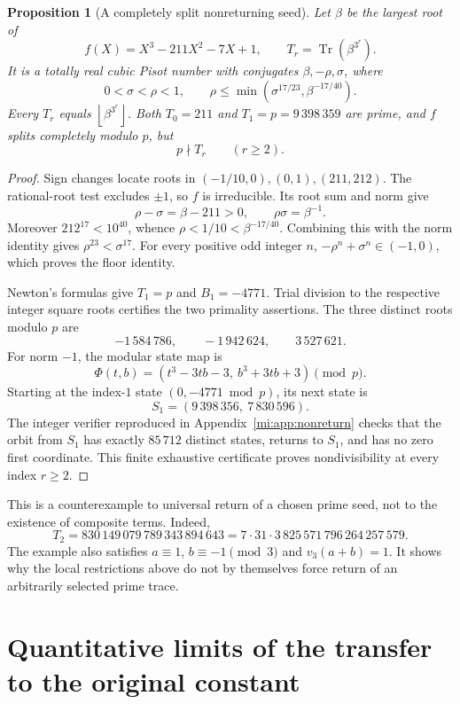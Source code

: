 \documentclass[11pt,a4paper]{article}
\numberwithin{equation}{section}
\newtheorem{proposition}[theorem]{Proposition}
\theoremstyle{definition}
\theoremstyle{remark}
\newcommand{\Tr}{\operatorname{Tr}}
\newcommand{\floor}[1]{\left\lfloor #1\right\rfloor}
\begin{document}
\begin{proposition}[A completely split nonreturning seed]
\label{mi:seed}
Let \(\beta\) be the largest root of
\[
 f(X)=X^3-211X^2-7X+1,
 \qquad T_r=\Tr(\beta^{3^r}).
\]
It is a totally real cubic Pisot number with conjugates
\(\beta,-\rho,\sigma\), where
\[
 0<\sigma<\rho<1,\qquad
 \rho\le\min(\sigma^{17/23},\beta^{-17/40}).
\]
Every \(T_r\) equals \(\floor{\beta^{3^r}}\).
Both \(T_0=211\) and \(T_1=p=9\,398\,359\) are prime, and \(f\)
splits completely modulo \(p\), but
\[
 p\nmid T_r\qquad(r\ge2).
\]
\end{proposition}

\begin{proof}
Sign changes locate roots in \((-1/10,0),(0,1),(211,212)\).
The rational-root test excludes \(\pm1\), so \(f\) is irreducible.
Its root sum and norm give
\[
 \rho-\sigma=\beta-211>0,\qquad \rho\sigma=\beta^{-1}.
\]
Moreover \(212^{17}<10^{40}\), whence
\(\rho<1/10<\beta^{-17/40}\).
Combining this with the norm identity gives
\(\rho^{23}<\sigma^{17}\).
For every positive odd integer \(n\),
\(-\rho^n+\sigma^n\in(-1,0)\), which proves the floor identity.

Newton's formulas give \(T_1=p\) and \(B_1=-4771\).
Trial division to the respective integer square roots certifies
the two primality assertions. The three distinct roots modulo
\(p\) are
\[
 -1\,584\,786,\qquad -1\,942\,624,\qquad 3\,527\,621.
\]
For norm \(-1\), the modular state map is
\[
 \Phi(t,b)=(t^3-3tb-3,\ b^3+3tb+3)\pmod p.
\]
Starting at the index-\(1\) state \((0,-4771\bmod p)\), its
next state is
\[
 S_1=(9\,398\,356,\ 7\,830\,596).
\]
The integer verifier reproduced in
Appendix~\ref{mi:app:nonreturn} checks that the orbit from \(S_1\)
has exactly \(85\,712\) distinct states, returns to \(S_1\), and
has no zero first coordinate. This finite exhaustive certificate
proves nondivisibility at every index \(r\ge2\).
\end{proof}

This is a counterexample to universal return of a chosen prime
seed, not to the existence of composite terms. Indeed,
\[
 T_2=830\,149\,079\,789\,343\,894\,643
     =7\cdot31\cdot3\,825\,571\,796\,264\,257\,579.
\]
The example also satisfies \(a\equiv1\), \(b\equiv-1\pmod3\)
and \(v_3(a+b)=1\). It shows why the local restrictions above
do not by themselves force return of an arbitrarily selected
prime trace.

\section{Quantitative limits of the transfer to the original constant}
\label{mi:limits}
\end{document}
